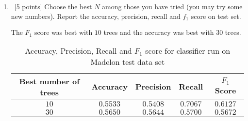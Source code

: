 \begin{enumerate}
\begin{enumerate}
  \item ~[5 points] Choose the best $N$ among those you have tried
    (you may try some new numbers). Report the accuracy, precision,
    recall and $f_1$ score on test set.
    
    The $F_1$ score was best with $10$ trees and the accuracy was best with $30$ trees.
          \begin{table}[H]
    \centering
    \begin{tabular}{| c | c | c | c | c |}
      \hline
      Best number of trees & Accuracy &Precision & Recall & $F_1$ Score  \\
      \hline
      $10$ & $0.5533$ & $0.5408$& $0.7067$& $0.6127$\\
      \hline
      $30$ & $0.5650$ & $0.5644$& $0.5700$& $0.5672$\\
      \hline
    \end{tabular}
    \caption{Accuracy, Precision, Recall and $F_1$ score for classifier run on Madelon test data set}
  \end{table}   
    
  \end{enumerate}
\end{enumerate}

